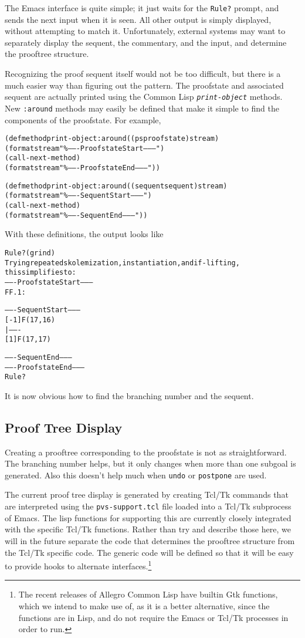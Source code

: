 \documentclass[12pt]{book}
\def\tilde{\symbol{'176}}
\newcommand{\functionnm}[1]{\texttt{\textit{#1}}}
\begin{document}
The Emacs interface is quite simple; it just waits for the \texttt{Rule?}
prompt, and sends the next input when it is seen.  All other output is
simply displayed, without attempting to match it.  Unfortunately, external
systems may want to separately display the sequent, the commentary, and
the input, and determine the prooftree structure.

Recognizing the proof sequent itself would not be too difficult, but there
is a much easier way than figuring out the pattern.  The proofstate and
associated sequent are actually printed using the Common Lisp
\functionnm{print-object} methods.  New \texttt{:around} methods may
easily be defined that make it simple to find the components of the
proofstate.  For example,
\begin{alltt}
  (defmethod print-object :around ((ps proofstate) stream)
    (format stream "\tilde\%-------Proofstate Start--------")
    (call-next-method)
    (format stream "\tilde\%-------Proofstate End--------"))

  (defmethod print-object :around ((sequent sequent) stream)
    (format stream "\tilde\%-------Sequent Start--------")
    (call-next-method)
    (format stream "\tilde\%-------Sequent End--------"))
\end{alltt}
With these definitions, the output looks like
\begin{alltt}
  Rule? (grind)
  Trying repeated skolemization, instantiation, and if-lifting,
  this simplifies to: 
  -------Proofstate Start--------
  FF.1 :  

  -------Sequent Start--------
  [-1]  F(17, 16)
    |-------
  [1]   F(17, 17)

  -------Sequent End--------
  -------Proofstate End--------
  Rule?
\end{alltt}
It is now obvious how to find the branching number and the sequent.

\subsection{Proof Tree Display}

Creating a prooftree corresponding to the proofstate is not as
straightforward.  The branching number helps, but it only changes when
more than one subgoal is generated.  Also this doesn't help much when
\texttt{undo} or \texttt{postpone} are used.

The current proof tree display is generated by creating Tcl/Tk commands
that are interpreted using the \texttt{pvs-support.tcl} file loaded into a
Tcl/Tk subprocess of Emacs.  The lisp functions for supporting this are
currently closely integrated with the specific Tcl/Tk functions.  Rather
than try and describe those here, we will in the future separate the code
that determines the prooftree structure from the Tcl/Tk specific code.
The generic code will be defined so that it will be easy to provide hooks
to alternate interfaces.\footnote{The recent releases of Allegro Common
Lisp have builtin Gtk functions, which we intend to make use of, as it is
a better alternative, since the functions are in Lisp, and do not require
the Emacs or Tcl/Tk processes in order to run.}
\end{document}
